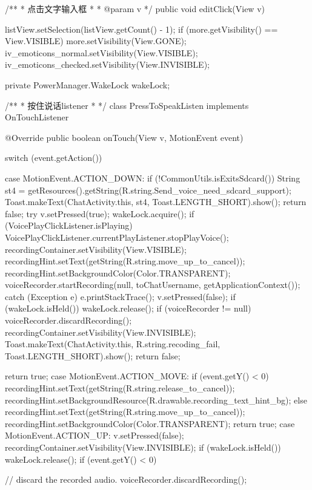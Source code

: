 {{{		}

	}

	/**
	 * 点击文字输入框
	 * 
	 * @param v
	 */
	public void editClick(View v) {
		listView.setSelection(listView.getCount() - 1);
		if (more.getVisibility() == View.VISIBLE) {
			more.setVisibility(View.GONE);
			iv_emoticons_normal.setVisibility(View.VISIBLE);
			iv_emoticons_checked.setVisibility(View.INVISIBLE);
		}

	}

	private PowerManager.WakeLock wakeLock;

	/**
	 * 按住说话listener
	 * 
	 */
	class PressToSpeakListen implements OnTouchListener {
		@Override
		public boolean onTouch(View v, MotionEvent event) {
			switch (event.getAction()) {
			case MotionEvent.ACTION_DOWN:
				if (!CommonUtils.isExitsSdcard()) {
					String st4 = getResources().getString(R.string.Send_voice_need_sdcard_support);
					Toast.makeText(ChatActivity.this, st4, Toast.LENGTH_SHORT).show();
					return false;
				}
				try {
					v.setPressed(true);
					wakeLock.acquire();
					if (VoicePlayClickListener.isPlaying)
						VoicePlayClickListener.currentPlayListener.stopPlayVoice();
					recordingContainer.setVisibility(View.VISIBLE);
					recordingHint.setText(getString(R.string.move_up_to_cancel));
					recordingHint.setBackgroundColor(Color.TRANSPARENT);
					voiceRecorder.startRecording(null, toChatUsername, getApplicationContext());
				} catch (Exception e) {
					e.printStackTrace();
					v.setPressed(false);
					if (wakeLock.isHeld())
						wakeLock.release();
					if (voiceRecorder != null)
						voiceRecorder.discardRecording();
					recordingContainer.setVisibility(View.INVISIBLE);
					Toast.makeText(ChatActivity.this, R.string.recoding_fail, Toast.LENGTH_SHORT).show();
					return false;
				}

				return true;
			case MotionEvent.ACTION_MOVE: {
				if (event.getY() < 0) {
					recordingHint.setText(getString(R.string.release_to_cancel));
					recordingHint.setBackgroundResource(R.drawable.recording_text_hint_bg);
				} else {
					recordingHint.setText(getString(R.string.move_up_to_cancel));
					recordingHint.setBackgroundColor(Color.TRANSPARENT);
				}
				return true;
			}
			case MotionEvent.ACTION_UP:
				v.setPressed(false);
				recordingContainer.setVisibility(View.INVISIBLE);
				if (wakeLock.isHeld())
					wakeLock.release();
				if (event.getY() < 0) {
					// discard the recorded audio.
					voiceRecorder.discardRecording();

}}}}}
